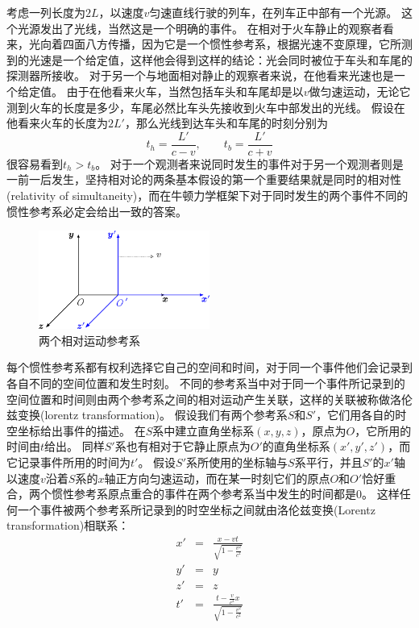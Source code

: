考虑一列长度为$2L$，以速度$v$匀速直线行驶的列车，在列车正中部有一个光源。
这个光源发出了光线，当然这是一个明确的事件。
在相对于火车静止的观察者看来，光向着四面八方传播，因为它是一个惯性参考系，根据光速不变原理，它所测到的光速是一个给定值，这样他会得到这样的结论：光会同时被位于车头和车尾的探测器所接收。
对于另一个与地面相对静止的观察者来说，在他看来光速也是一个给定值。
由于在他看来火车，当然包括车头和车尾却是以$v$做匀速运动，无论它测到火车的长度是多少，车尾必然比车头先接收到火车中部发出的光线。
假设在他看来火车的长度为$2L'$，那么光线到达车头和车尾的时刻分别为
\begin{equation}
t_h=\frac{L'}{c-v},\qquad t_b=\frac{L'}{c+v}
\end{equation}
很容易看到$t_h>t_b$。
对于一个观测者来说同时发生的事件对于另一个观测者则是一前一后发生，坚持相对论的两条基本假设的第一个重要结果就是{\heiti 同时的相对性}(relativity of simultaneity)，而在牛顿力学框架下对于同时发生的两个事件不同的惯性参考系必定会给出一致的答案。


\begin{figure}[htb]
\centering
\includegraphics[width=0.5\textwidth]{images/relativity-3}
\caption{两个相对运动参考系}
\label{fig:relativity-3}
\end{figure}


每个惯性参考系都有权利选择它自己的空间和时间，对于同一个事件他们会记录到各自不同的空间位置和发生时刻。
不同的参考系当中对于同一个事件所记录到的空间位置和时间则由两个参考系之间的相对运动产生关联，这样的关联被称做{\heiti 洛伦兹变换}(lorentz transformation)。
假设我们有两个参考系$S$和$S'$，它们用各自的时空坐标给出事件的描述。
在$S$系中建立直角坐标系$(x,y,z)$，原点为$O$，它所用的时间由$t$给出。
同样$S'$系也有相对于它静止原点为$O'$的直角坐标系$(x',y',z')$，而它记录事件所用的时间为$t'$。
假设$S'$系所使用的坐标轴与$S$系平行，并且$S'$的$x'$轴以速度$v$沿着$S$系的$x$轴正方向匀速运动，而在某一时刻它们的原点$O$和$O'$恰好重合，两个惯性参考系原点重合的事件在两个参考系当中发生的时间都是0。
这样任何一个事件被两个参考系所记录到的时空坐标之间就由{\heiti 洛伦兹变换}(Lorentz transformation)相联系：
\begin{eqnarray}
x'&=&\frac{x-vt}{\sqrt{1-\frac{v^2}{c^2}}}\label{eqn: x的Lorentz变换}\\
y'&=&y\\
z'&=&z\\
t'&=&\frac{t-\frac{v}{c^2}x}{\sqrt{1-\frac{v^2}{c^2}}}\label{eqn: t的Lorentz变换}
\end{eqnarray}



